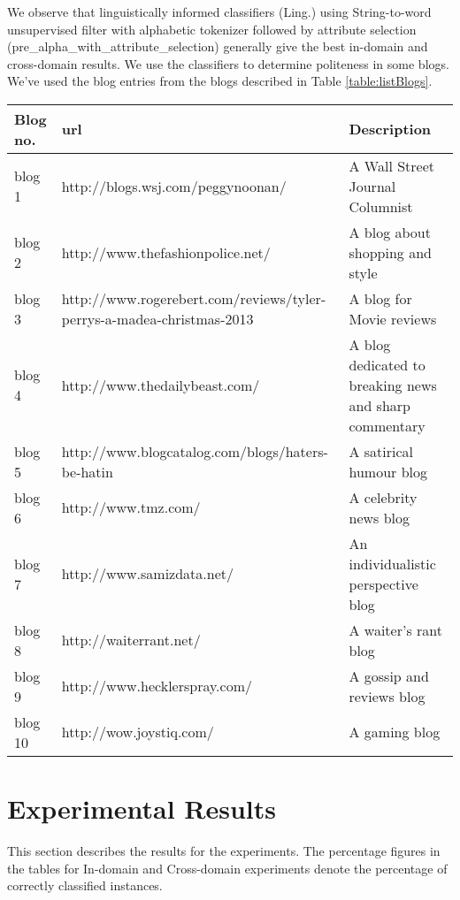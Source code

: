 \documentclass[conference]{IEEEtran}
\begin{document}
We observe that linguistically informed classifiers (Ling.) using String-to-word unsupervised filter with alphabetic tokenizer followed by attribute selection (pre\_alpha\_with\_attribute\_selection) generally give the best in-domain and cross-domain results. We use the classifiers to determine politeness in some blogs. We've used the blog entries from the blogs described in Table \ref{table:listBlogs}.
\begin{table*}[htbp]
\caption{Blogs used in testing}
\centering
\vspace{5pt}
\begin{tabular}{|l|l|l|}
\hline
Blog no. & url & Description \\
\hline\hline
blog 1 & http://blogs.wsj.com/peggynoonan/ & A Wall Street Journal Columnist \\
\hline
blog 2 & http://www.thefashionpolice.net/ & A blog about shopping and style \\
\hline
blog 3 & http://www.rogerebert.com/reviews/tyler-perrys-a-madea-christmas-2013 & A blog for Movie reviews \\
\hline
blog 4 & http://www.thedailybeast.com/ & A blog dedicated to breaking news and sharp commentary \\
\hline
blog 5 & http://www.blogcatalog.com/blogs/haters-be-hatin & A satirical humour blog \\
\hline
blog 6 & http://www.tmz.com/ & A celebrity news blog \\
\hline
blog 7 & http://www.samizdata.net/ & An individualistic perspective blog \\ 
\hline
blog 8 & http://waiterrant.net/ & A waiter's rant blog \\
\hline
blog 9 & http://www.hecklerspray.com/ & A gossip and reviews blog \\
\hline
blog 10 & http://wow.joystiq.com/ & A gaming blog \\
\hline
\hline
\end{tabular}
\label{table:listBlogs}
\end{table*}


\section{Experimental Results}

This section describes the results for the experiments. The percentage figures in the tables for In-domain and Cross-domain experiments denote the percentage of correctly classified instances.
\end{document}
